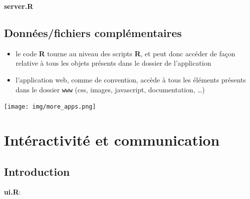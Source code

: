 \documentclass[
]{article}
\newenvironment{Shaded}{\begin{snugshade}}{\end{snugshade}}
\newcommand{\ControlFlowTok}[1]{\textcolor[rgb]{0.13,0.29,0.53}{\textbf{#1}}}
\newcommand{\FunctionTok}[1]{\textcolor[rgb]{0.00,0.00,0.00}{#1}}
\newcommand{\NormalTok}[1]{#1}
\newcommand{\OtherTok}[1]{\textcolor[rgb]{0.56,0.35,0.01}{#1}}
\newcommand{\SpecialCharTok}[1]{\textcolor[rgb]{0.00,0.00,0.00}{#1}}
\providecommand{\tightlist}{%
  \setlength{\itemsep}{0pt}\setlength{\parskip}{0pt}}
\begin{document}
\textbf{server.R}

\begin{Shaded}
\end{Shaded}

\hypertarget{donnuxe9esfichiers-compluxe9mentaires}{%
\subsection{Données/fichiers
complémentaires}\label{donnuxe9esfichiers-compluxe9mentaires}}

\begin{itemize}
\tightlist
\item
  le code \textbf{R} tourne au niveau des scripts \textbf{R}, et peut
  donc accéder de façon relative à tous les objets présents dans le
  dossier de l'application
\item
  l'application web, comme de convention, accède à tous les éléments
  présents dans le dossier \texttt{www} (css, images, javascript,
  documentation, \ldots)
\end{itemize}

\texttt{[image: img/more\_apps.png]}

\hypertarget{intuxe9ractivituxe9-et-communication}{%
\section{Intéractivité et
communication}\label{intuxe9ractivituxe9-et-communication}}

\hypertarget{introduction}{%
\subsection{Introduction}\label{introduction}}

\textbf{ui.R}:
\end{document}
